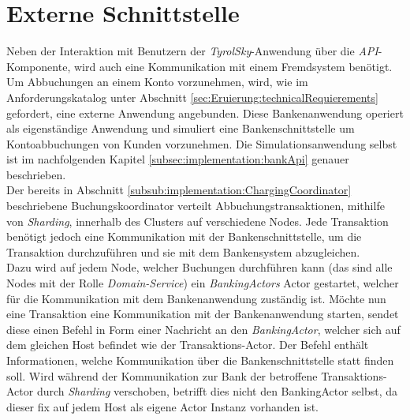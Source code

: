 \section{Externe Schnittstelle}
\label{sec:implementation:externalApi}
Neben der Interaktion mit Benutzern der \textit{TyrolSky}-Anwendung über die \textit{API}-Komponente, wird auch eine Kommunikation mit einem Fremdsystem benötigt. Um Abbuchungen an einem Konto vorzunehmen, wird, wie im Anforderungskatalog unter Abschnitt \ref{sec:Eruierung:technicalRequierements} gefordert, eine externe Anwendung angebunden. Diese Bankenanwendung operiert als eigenständige Anwendung und simuliert eine Bankenschnittstelle um Kontoabbuchungen von Kunden vorzunehmen. Die Simulationsanwendung selbst ist im nachfolgenden Kapitel \ref{subsec:implementation:bankApi} genauer beschrieben. \\
Der bereits in Abschnitt \ref{subsub:implementation:ChargingCoordinator}  beschriebene Buchungskoordinator verteilt Abbuchungstransaktionen, mithilfe von \textit{Sharding}, innerhalb des Clusters auf verschiedene Nodes. Jede Transaktion benötigt jedoch eine Kommunikation mit der Bankenschnittstelle, um die Transaktion durchzuführen und sie mit dem Bankensystem abzugleichen.  \\
Dazu wird auf jedem Node, welcher Buchungen durchführen kann (das sind alle Nodes mit der Rolle \textit{Domain-Service}) ein \textit{BankingActors} Actor gestartet, welcher für die Kommunikation mit dem Bankenanwendung zuständig ist.
% 
% 
Möchte nun eine Transaktion eine Kommunikation mit der Bankenanwendung starten, sendet diese einen Befehl in Form einer Nachricht an den \textit{BankingActor}, welcher sich auf dem gleichen Host befindet wie der Transaktions-Actor. Der Befehl enthält Informationen, welche Kommunikation über die Bankenschnittstelle statt finden soll. Wird während der Kommunikation zur Bank der betroffene Transaktions-Actor durch \textit{Sharding} verschoben, betrifft dies nicht den BankingActor selbst, da dieser fix auf jedem Host als eigene Actor Instanz vorhanden ist. 
% 
% 

